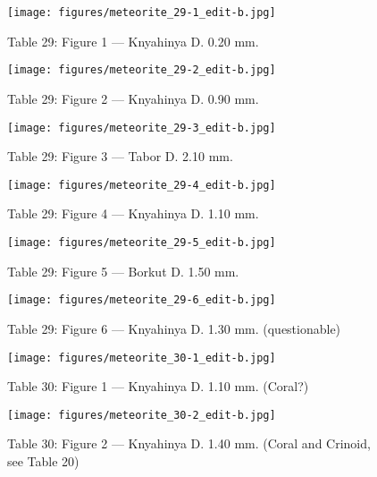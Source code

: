 \documentclass[a4paper, 12pt, oneside]{article}
\begin{document}
\clearpage
{}
\begin{figure}[t]
\texttt{[image: figures/meteorite\_29-1\_edit-b.jpg]}
\caption{Table 29: Figure 1 --- Knyahinya D. 0.20 mm.}
\centering
\end{figure}
\clearpage
\begin{figure}[t]
\texttt{[image: figures/meteorite\_29-2\_edit-b.jpg]}
\caption{Table 29: Figure 2 --- Knyahinya D. 0.90 mm.}
\centering
\end{figure}
\clearpage
\begin{figure}[t]
\texttt{[image: figures/meteorite\_29-3\_edit-b.jpg]}
\caption{Table 29: Figure 3 --- Tabor D. 2.10 mm.}
\centering
\end{figure}
\clearpage
\begin{figure}[t]
\texttt{[image: figures/meteorite\_29-4\_edit-b.jpg]}
\caption{Table 29: Figure 4 --- Knyahinya D. 1.10 mm.}
\centering
\end{figure}
\clearpage
\begin{figure}[t]
\texttt{[image: figures/meteorite\_29-5\_edit-b.jpg]}
\caption{Table 29: Figure 5 --- Borkut D. 1.50 mm.}
\centering
\end{figure}
\clearpage
\begin{figure}[t]
\texttt{[image: figures/meteorite\_29-6\_edit-b.jpg]}
\caption{Table 29: Figure 6 --- Knyahinya D. 1.30 mm. (questionable)}
\centering
\end{figure}
\clearpage
{}
\begin{figure}[t]
\texttt{[image: figures/meteorite\_30-1\_edit-b.jpg]}
\caption{Table 30: Figure 1 --- Knyahinya D. 1.10 mm. (Coral?)}
\centering
\end{figure}
\clearpage
\begin{figure}[t]
\texttt{[image: figures/meteorite\_30-2\_edit-b.jpg]}
\caption{Table 30: Figure 2 --- Knyahinya D. 1.40 mm. (Coral and Crinoid, see Table 20)}
\centering
\end{figure}
\end{document}
